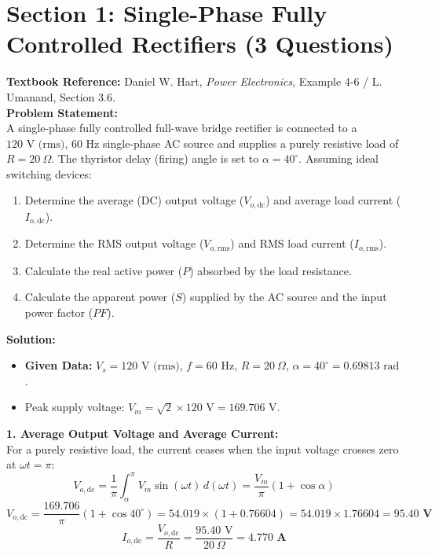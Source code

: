\documentclass[10pt,a4paper]{article}
\begin{document}
\section*{Section 1: Single-Phase Fully Controlled Rectifiers (3 Questions)}

\begin{tcolorbox}[qbox, title={Question 1: Single-Phase Full Converter with Resistive Load}]
\textbf{Textbook Reference:} Daniel W. Hart, \textit{Power Electronics}, Example 4-6 / L. Umanand, Section 3.6.\\[1mm]
\textbf{Problem Statement:}\\
A single-phase fully controlled full-wave bridge rectifier is connected to a $120\text{ V (rms)}$, $60\text{ Hz}$ single-phase AC source and supplies a purely resistive load of $R = 20\ \Omega$. The thyristor delay (firing) angle is set to $\alpha = 40^\circ$. Assuming ideal switching devices:
\begin{enumerate}
  \item Determine the average (DC) output voltage ($V_{o,\text{dc}}$) and average load current ($I_{o,\text{dc}}$).
  \item Determine the RMS output voltage ($V_{o,\text{rms}}$) and RMS load current ($I_{o,\text{rms}}$).
  \item Calculate the real active power ($P$) absorbed by the load resistance.
  \item Calculate the apparent power ($S$) supplied by the AC source and the input power factor ($PF$).
\end{enumerate}
\end{tcolorbox}

\vspace{1mm}
\noindent\textbf{\textcolor{accentteal}{Solution:}}
\begin{itemize}
  \item \textbf{Given Data:} $V_s = 120\text{ V (rms)}$, $f = 60\text{ Hz}$, $R = 20\ \Omega$, $\alpha = 40^\circ = 0.69813\text{ rad}$.
  \item Peak supply voltage: $V_m = \sqrt{2} \times 120\text{ V} = 169.706\text{ V}$.
\end{itemize}

\noindent\textbf{1. Average Output Voltage and Average Current:}\\
For a purely resistive load, the current ceases when the input voltage crosses zero at $\omega t = \pi$:
\[
V_{o,\text{dc}} = \frac{1}{\pi} \int_{\alpha}^{\pi} V_m \sin(\omega t)\, d(\omega t) = \frac{V_m}{\pi} (1 + \cos\alpha)
\]
\[
V_{o,\text{dc}} = \frac{169.706}{\pi} (1 + \cos 40^\circ) = 54.019 \times (1 + 0.76604) = 54.019 \times 1.76604 = \mathbf{95.40\text{ V}}
\]
\[
I_{o,\text{dc}} = \frac{V_{o,\text{dc}}}{R} = \frac{95.40\text{ V}}{20\ \Omega} = \mathbf{4.770\text{ A}}
\]
\end{document}
